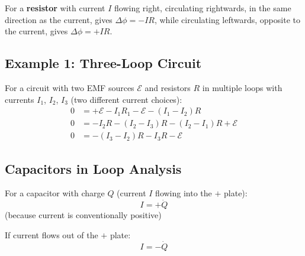 For a \textbf{resistor} with current $I$ flowing right, circulating rightwards, in the same direction as the current, gives $\Delta\phi = -IR$, while circulating leftwards, opposite to the current, gives $\Delta\phi = +IR$.

\subsection{Example 1: Three-Loop Circuit}

For a circuit with two EMF sources $\mathcal{E}$ and resistors $R$ in multiple loops with currents $I_1$, $I_2$, $I_3$ (two different current choices):
\begin{align*}
    0 &= +\mathcal{E} - I_1 R_1 - \mathcal{E} - (I_1 - I_2)R \\
    0 &= -I_2 R - (I_2-I_3)R - (I_2-I_1)R + \mathcal{E} \\
    0 &= -(I_3-I_2)R - I_3 R - \mathcal{E}
\end{align*}

\subsection{Capacitors in Loop Analysis}

For a capacitor with charge $Q$ (current $I$ flowing into the $+$ plate):
\[
    I = +\dot{Q}
\]
(because current is conventionally positive)

If current flows out of the $+$ plate:
\[
    I = -\dot{Q}
\]

